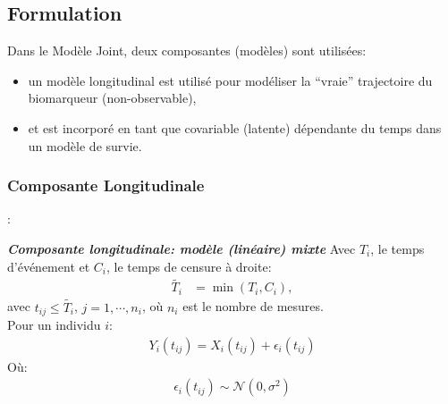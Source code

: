 \documentclass[10pt,  xcolors={RGB}, hyperref={%
    pdfpagelabels=false,
    colorlinks=true,
    pdftex=true,
    bookmarks=true,
    bookmarksopen=true,
    hyperfootnotes=true}]{beamer}
\begin{document}
\subsection{Formulation}
\begin{frame}{\subsecname}
    \par{Dans le Modèle Joint, deux composantes (modèles) sont utilisées:}
	\begin{itemize}
		\item un modèle longitudinal est utilisé pour modéliser la ``vraie'' trajectoire du biomarqueur (non-observable),
		\item<2> et est incorporé en tant que covariable (latente) dépendante du temps dans un modèle de survie.
	\end{itemize}
\end{frame}


\subsubsection{Composante Longitudinale}
\begin{frame}{\subsecname: \subsubsecname}
    \begin{center}\begin{minipage}[t]{0.85\textwidth}\vspace{-1.5em}\begin{block}{\itshape\textbf{Composante longitudinale: modèle (linéaire) mixte}}
        Avec $T_i$, le temps d'événement et $C_i$, le temps de censure à droite: \begin{align}\tilde{T_i}&=\min(T_i, C_i),\end{align}
        avec $t_{ij}\leq \tilde{T_i}$, $j=1, \cdots, n_i$, où  $n_i$ est le nombre de mesures.\\[1.5em]
        Pour un individu $i$: \begin{align}Y_{i}(t_{ij})=X_{i}(t_{ij})+\epsilon_{i}(t_{ij})\end{align}
        Où: \begin{align}\epsilon_{i}(t_{ij}) \sim \mathcal{N}(0, \sigma^2)\end{align}
    \end{block}\vspace{1.5em}\end{minipage}\end{center}
\end{frame}
\end{document}
